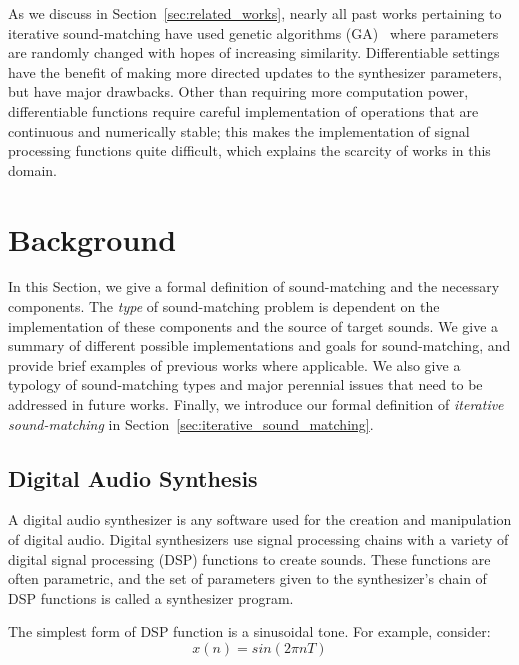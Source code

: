 \documentclass[lettersize,journal]{IEEEtran}
\providecommand{\gls}[1]{#1}
\begin{document}
 As we discuss in Section~\ref{sec:related_works}, nearly all past works pertaining to iterative sound-matching have used genetic algorithms (\gls{GA})~\cite{holland1992genetic} where parameters are randomly changed with hopes of increasing similarity. Differentiable settings have the benefit of making more directed updates to the synthesizer parameters, but have major drawbacks. Other than requiring more computation power, differentiable functions require careful implementation of operations that are continuous and numerically stable; this makes the implementation of signal processing functions quite difficult, which explains the scarcity of works in this domain.
 
\section{Background}
In this Section, we give a formal definition of sound-matching and the necessary components. The \textit{type} of sound-matching problem is dependent on the implementation of these components and the source of target sounds. We give a summary of different possible implementations and goals for sound-matching, and provide brief examples of previous works where applicable. We also give a typology of sound-matching types and major perennial issues that need to be addressed in future works. Finally, we introduce our formal definition of \textit{iterative sound-matching} in Section~\ref{sec:iterative_sound_matching}.


\label{sec:background}

\subsection{Digital Audio Synthesis}
\label{sec:diffSynth}
A digital audio synthesizer is any software used for the creation and manipulation of digital audio. Digital synthesizers use signal processing chains with a variety of digital signal processing (\gls{DSP}) functions to create sounds. These functions are often parametric, and the set of parameters given to the synthesizer's chain of DSP functions is called a synthesizer program.

The simplest form of DSP function is a sinusoidal tone. For example, consider:
\[ x(n) = sin( 2\pi n T)\]
\end{document}
